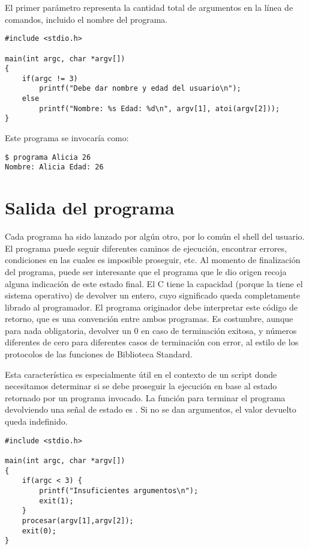 \begin{ejemplo}
El primer parámetro representa la cantidad total de argumentos en la
      línea de comandos, incluido el nombre del programa.

\begin{lstlisting}
#include <stdio.h>

main(int argc, char *argv[])
{
    if(argc != 3)
        printf("Debe dar nombre y edad del usuario\n");
    else
        printf("Nombre: %s Edad: %d\n", argv[1], atoi(argv[2]));
}	
\end{lstlisting}

Este programa se invocaría como:
\begin{lstlisting}
$ programa Alicia 26
Nombre: Alicia Edad: 26
\end{lstlisting}
\end{ejemplo}

\section{Salida del programa}
Cada programa ha sido lanzado por algún otro, por lo común el shell del
usuario. El programa puede seguir diferentes caminos de ejecución, encontrar
errores, condiciones en las cuales es imposible proseguir, etc. Al momento de
finalización del programa, puede ser interesante que el programa que le dio
origen recoja alguna indicación de este estado final. El C tiene la capacidad
(porque la tiene el sistema operativo) de devolver un entero, cuyo significado
queda completamente librado al programador. El programa originador debe
interpretar este código de retorno, que es una convención entre ambos
programas. Es costumbre, aunque para nada obligatoria, devolver un 0 en caso de
terminación exitosa, y números diferentes de cero para diferentes casos de
terminación con error, al estilo de los protocolos de las funciones de
Biblioteca Standard.

Esta característica es especialmente útil en el contexto de un script donde
necesitamos determinar si se debe proseguir la ejecución en base al estado
retornado por un programa invocado.
La función para terminar el programa devolviendo una señal de estado es .
Si no se dan argumentos, el valor devuelto queda indefinido.


\begin{ejemplo}
\begin{lstlisting}
#include <stdio.h>

main(int argc, char *argv[])
{
    if(argc < 3) {
        printf("Insuficientes argumentos\n");
        exit(1);
    }
    procesar(argv[1],argv[2]);
    exit(0);
}
\end{lstlisting}
\end{ejemplo}

